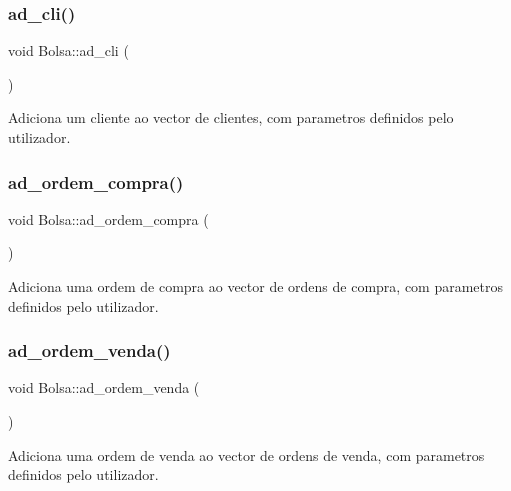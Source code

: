 \subsubsection{\texorpdfstring{ad\+\_\+cli()}{ad\_cli()}}
{\footnotesize\ttfamily void Bolsa\+::ad\+\_\+cli (\begin{DoxyParamCaption}{ }\end{DoxyParamCaption})}



Adiciona um cliente ao vector de clientes, com parametros definidos pelo utilizador. 

\hypertarget{class_bolsa_a6567e62d4d1037ca2e2263ba7e22ea4e}{}\label{class_bolsa_a6567e62d4d1037ca2e2263ba7e22ea4e} 
\subsubsection{\texorpdfstring{ad\+\_\+ordem\+\_\+compra()}{ad\_ordem\_compra()}}
{\footnotesize\ttfamily void Bolsa\+::ad\+\_\+ordem\+\_\+compra (\begin{DoxyParamCaption}{ }\end{DoxyParamCaption})}



Adiciona uma ordem de compra ao vector de ordens de compra, com parametros definidos pelo utilizador. 

\hypertarget{class_bolsa_ab028d3fd8537fa65b25c7eece82dfabc}{}\label{class_bolsa_ab028d3fd8537fa65b25c7eece82dfabc} 
\subsubsection{\texorpdfstring{ad\+\_\+ordem\+\_\+venda()}{ad\_ordem\_venda()}}
{\footnotesize\ttfamily void Bolsa\+::ad\+\_\+ordem\+\_\+venda (\begin{DoxyParamCaption}{ }\end{DoxyParamCaption})}



Adiciona uma ordem de venda ao vector de ordens de venda, com parametros definidos pelo utilizador. 

\hypertarget{class_bolsa_a12c0a8faf58b0803228ed17022c6ecfe}{}\label{class_bolsa_a12c0a8faf58b0803228ed17022c6ecfe} 
